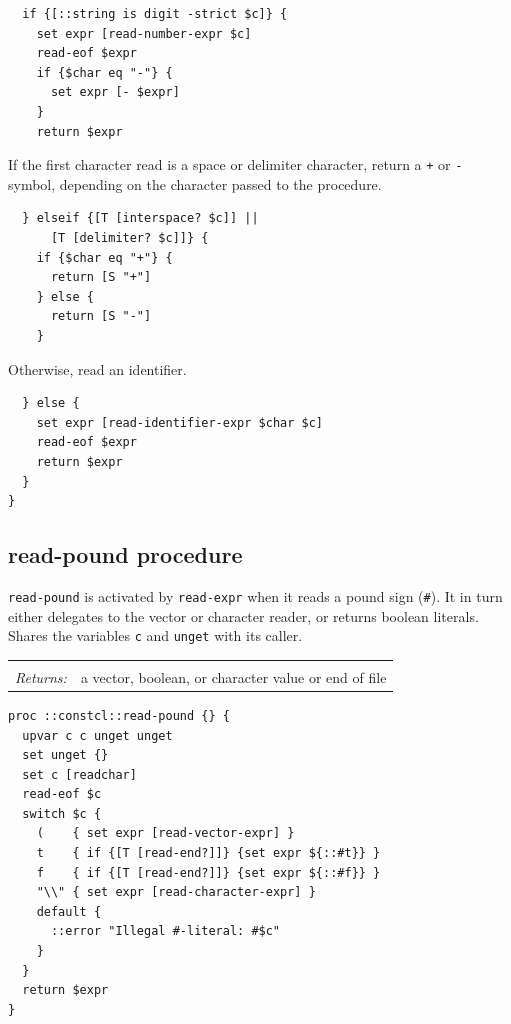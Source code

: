 \documentclass[a5paper,draft]{memoir}
\begin{document}
\begin{lstlisting}
  if {[::string is digit -strict $c]} {
    set expr [read-number-expr $c]
    read-eof $expr
    if {$char eq "-"} {
      set expr [- $expr]
    }
    return $expr
\end{lstlisting}

If the first character read is a space or delimiter character, return a \texttt{+} or \texttt{-} symbol, depending on the character passed to the procedure.

\begin{lstlisting}
  } elseif {[T [interspace? $c]] ||
      [T [delimiter? $c]]} {
    if {$char eq "+"} {
      return [S "+"]
    } else {
      return [S "-"]
    }
\end{lstlisting}

Otherwise, read an identifier.

\begin{lstlisting}
  } else {
    set expr [read-identifier-expr $char $c]
    read-eof $expr
    return $expr
  }
}
\end{lstlisting}

\subsection{read-pound procedure}
\label{readpound-procedure}

\texttt{read-pound} is activated by \texttt{read-expr} when it reads a pound sign (\texttt{\#}). It in turn either delegates to the vector or character reader, or returns boolean literals. Shares the variables \texttt{c} and \texttt{unget} with its caller.

\noindent\begin{tabular}{ |p{1.9cm} p{6.5cm}| }
\hline
\rowcolor[HTML]{CCCCCC} \multicolumn{2}{|l|}{\textbf{read-pound (internal)}} \\
\textit{Returns:} & a vector, boolean, or character value or end of file \\
\hline
\end{tabular}

\begin{lstlisting}
proc ::constcl::read-pound {} {
  upvar c c unget unget
  set unget {}
  set c [readchar]
  read-eof $c
  switch $c {
    (    { set expr [read-vector-expr] }
    t    { if {[T [read-end?]]} {set expr ${::#t}} }
    f    { if {[T [read-end?]]} {set expr ${::#f}} }
    "\\" { set expr [read-character-expr] }
    default {
      ::error "Illegal #-literal: #$c"
    }
  }
  return $expr
}
\end{lstlisting}
\end{document}
